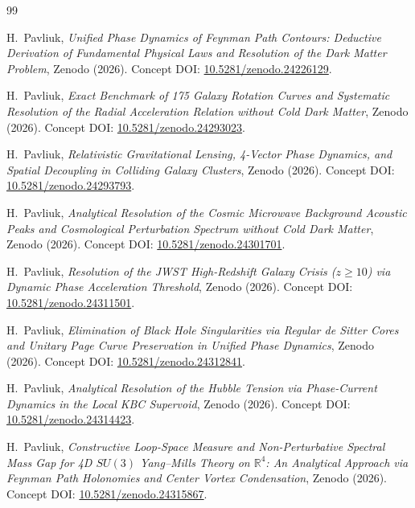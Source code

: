 \documentclass[11pt,a4paper]{article}
\theoremstyle{definition}
\begin{document}
\begin{thebibliography}{99}

H.~Pavliuk, \textit{Unified Phase Dynamics of Feynman Path Contours: Deductive Derivation of Fundamental Physical Laws and Resolution of the Dark Matter Problem}, Zenodo (2026). Concept DOI: \href{https://doi.org/10.5281/zenodo.24226129}{10.5281/zenodo.24226129}.

H.~Pavliuk, \textit{Exact Benchmark of 175 Galaxy Rotation Curves and Systematic Resolution of the Radial Acceleration Relation without Cold Dark Matter}, Zenodo (2026). Concept DOI: \href{https://doi.org/10.5281/zenodo.24293023}{10.5281/zenodo.24293023}.

H.~Pavliuk, \textit{Relativistic Gravitational Lensing, 4-Vector Phase Dynamics, and Spatial Decoupling in Colliding Galaxy Clusters}, Zenodo (2026). Concept DOI: \href{https://doi.org/10.5281/zenodo.24293793}{10.5281/zenodo.24293793}.

H.~Pavliuk, \textit{Analytical Resolution of the Cosmic Microwave Background Acoustic Peaks and Cosmological Perturbation Spectrum without Cold Dark Matter}, Zenodo (2026). Concept DOI: \href{https://doi.org/10.5281/zenodo.24301701}{10.5281/zenodo.24301701}.

H.~Pavliuk, \textit{Resolution of the JWST High-Redshift Galaxy Crisis ($z \ge 10$) via Dynamic Phase Acceleration Threshold}, Zenodo (2026). Concept DOI: \href{https://doi.org/10.5281/zenodo.24311501}{10.5281/zenodo.24311501}.

H.~Pavliuk, \textit{Elimination of Black Hole Singularities via Regular de Sitter Cores and Unitary Page Curve Preservation in Unified Phase Dynamics}, Zenodo (2026). Concept DOI: \href{https://doi.org/10.5281/zenodo.24312841}{10.5281/zenodo.24312841}.

H.~Pavliuk, \textit{Analytical Resolution of the Hubble Tension via Phase-Current Dynamics in the Local KBC Supervoid}, Zenodo (2026). Concept DOI: \href{https://doi.org/10.5281/zenodo.24314423}{10.5281/zenodo.24314423}.

H.~Pavliuk, \textit{Constructive Loop-Space Measure and Non-Perturbative Spectral Mass Gap for 4D $SU(3)$ Yang--Mills Theory on $\mathbb{R}^4$: An Analytical Approach via Feynman Path Holonomies and Center Vortex Condensation}, Zenodo (2026). Concept DOI: \href{https://doi.org/10.5281/zenodo.24315867}{10.5281/zenodo.24315867}.


\end{thebibliography}
\end{document}
